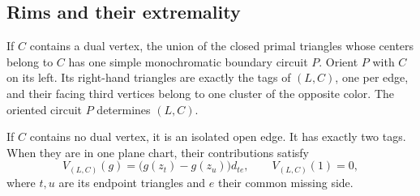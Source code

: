 \subsection{Rims and their extremality}

\begin{lemma}\label{lemma:rim}
If $C$ contains a dual vertex, the union of the closed primal triangles
whose centers belong to $C$ has one simple monochromatic boundary circuit
$P$.  Orient $P$ with $C$ on its left.  Its right-hand triangles are exactly
the tags of $(L,C)$, one per edge, and their facing third vertices belong to
one cluster of the opposite color.  The oriented circuit $P$ determines
$(L,C)$.

If $C$ contains no dual vertex, it is an isolated open edge.  It has exactly
two tags.  When they are in one plane chart, their contributions satisfy
\begin{equation}\label{fields:isolated}
 V_{(L,C)}(g)=\bigl(g(z_t)-g(z_u)\bigr)d_{te},
 \qquad V_{(L,C)}(1)=0,
\end{equation}
where $t,u$ are its endpoint triangles and $e$ their common missing side.
\end{lemma}

